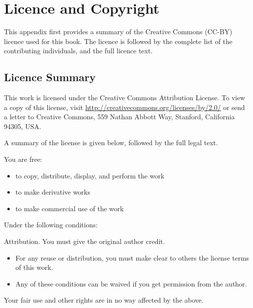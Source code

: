 \documentclass[a4paper,10pt,twoside]{book}
\begin{document}
  \sloppy
\fi


\chapter{Licence and Copyright}

This appendix first provides a summary of the Creative Commons (CC-BY) licence used for this book. 
The licence is followed by the complete list of the contributing individuals, and the full licence text.

\section{Licence Summary}

This work is licensed under the Creative Commons Attribution License.
To view a copy of this license, visit 
\url{http://creativecommons.org/licenses/by/2.0/} or send a letter to
Creative Commons, 559 Nathan Abbott Way, Stanford, California 94305, USA.

\noindent A summary of the license is given below, followed by the full legal text.

\noindent You are free:

\begin{itemize}
  \item to copy, distribute, display, and perform the work
  \item to make derivative works
  \item to make commercial use of the work
\end{itemize}

\noindent Under the following conditions:
	
\noindent Attribution. You must give the original author credit.

\begin{itemize}
\item For any reuse or distribution, you must make clear to others the
      license terms of this work.

\item Any of these conditions can be waived if you get permission from
      the author.
\end{itemize}

\noindent Your fair use and other rights are in no way affected by the above.
\end{document}
